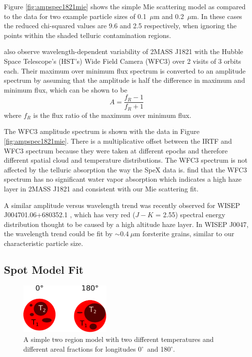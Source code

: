 \documentclass[twocolumn]{aastex6}
\newcommand{\degree}{$^\circ$}
\begin{document}
Figure \ref{fig:ampspec1821mie} shows the simple Mie scattering model as compared to the data for two example particle sizes of 0.1~$\mu$m and 0.2~$\mu$m.
In these cases the reduced chi-squared values are 9.6 and 2.5 respectively, when ignoring the points within the shaded telluric contamination regions.

\citet{yang2015hstRotBD} also observe wavelength-dependent variability of 2MASS J1821 with the Hubble Space Telescope's (HST's) Wide Field Camera (WFC3) over 2 visits of 3 orbits each.
Their maximum over minimum flux spectrum is converted to an amplitude spectrum by assuming that the amplitude is half the difference in maximum and minimum flux, which can be shown to be 
\begin{equation}
A  = \frac{f_R - 1}{f_R + 1}
\end{equation}\label{eq:ampFromRatio}
where $f_R$ is the flux ratio of the maximum over minimum flux.

The WFC3 amplitude spectrum is shown with the data in Figure \ref{fig:ampspec1821mie}.
There is a multiplicative offset between the IRTF and WFC3 spectrum because they were taken at different epochs and therefore different spatial cloud and temperature distributions.
The WFC3 spectrum is not affected by the telluric absorption the way the SpeX data is.
\citet{yang2015hstRotBD} find that the WFC3 spectrum has no significant water vapor absorption which indicates a high haze layer in 2MASS J1821 and consistent with our Mie scattering fit.

A similar amplitude versus wavelength trend was recently observed for WISEP J004701.06+680352.1 \citep{lew2016w0047}, which has very red ($J-K$ = 2.55) spectral energy distribution thought to be caused by a high altitude haze layer.
In WISEP J0047, the wavelength trend could be fit by $\sim 0.4~\mu$m forsterite grains, similar to our characteristic particle size.

\subsection{Spot Model Fit}

\begin{figure}
\begin{centering}
\includegraphics[width=0.4\textwidth]{temperature_drawing.pdf}
\caption{A simple two region model with two different temperatures and different areal fractions for longitudes 0\degree\ and 180\degree.}\label{fig:tdiffschem}
\end{centering}
\end{figure}
\end{document}
